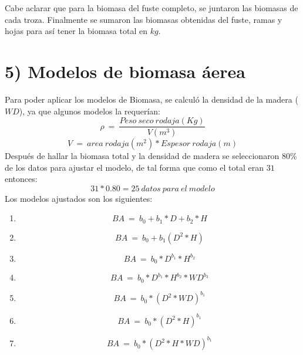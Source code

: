 \documentclass[9pt,onecolumn,twoside,]{pinp}
\providecommand{\tightlist}{%
  \setlength{\itemsep}{0pt}\setlength{\parskip}{0pt}}
\begin{document}
Cabe aclarar que para la biomasa del fuste completo, se juntaron las
biomasas de cada troza. Finalmente se sumaron las biomasas obtenidas del
fuste, ramas y hojas para así tener la biomasa total en \(kg\).

\hypertarget{modelos-de-biomasa-uxe1erea}{%
\section{5) Modelos de biomasa
áerea}\label{modelos-de-biomasa-uxe1erea}}

Para poder aplicar los modelos de Biomasa, se calculó la densidad de la
madera (\(WD\)), ya que algunos modelos la requerían:
\[\rho \ = \  \frac{Peso \ seco \ rodaja (Kg)}{ V(m^3)}\]
\[V \ = \ area \ rodaja (m^2) * Espesor \ rodaja (m)\] Después de hallar la
biomasa total y la densidad de madera se seleccionaron 80\% de los datos
para ajustar el modelo, de tal forma que como el total eran \(31\)
entonces: \[31*0.80= 25 \ datos \ para \ el \ modelo\] Los modelos
ajustados son los siguientes:

\begin{enumerate}
\def\labelenumi{\alph{enumi})}
\tightlist
\item
  \[BA \ = \ b_0 + b_1*D+b_2*H\]
\item
  \[BA \ = \ b_0+b_1(D^2*H)\]
\item
  \[BA \ = \ b_0*D^{b_1}*H^{b_2}\]
\item
  \[BA \ = \ b_0*D^{b_1}*H^{b_2}*WD^{b_3}\]
\item
  \[BA \ = \ b_0*(D^2*WD)^{b_1}\]
\item
  \[BA \ = \ b_0*(D^2*H)^{b_1}\]
\item
  \[BA \ = \ b_0*(D^2*H*WD)^{b_1}\]
\end{enumerate}
\end{document}
